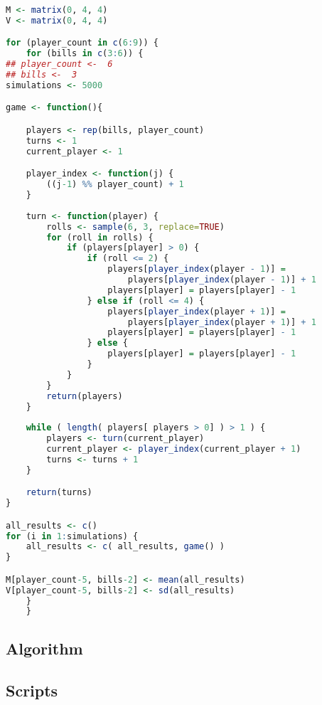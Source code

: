 \documentclass[12pt]{article}
\begin{document}
\begin{lstlisting}[language=R]
  M <- matrix(0, 4, 4)
V <- matrix(0, 4, 4)

for (player_count in c(6:9)) {
    for (bills in c(3:6)) {
## player_count <-  6
## bills <-  3
simulations <- 5000

game <- function(){

    players <- rep(bills, player_count)
    turns <- 1
    current_player <- 1

    player_index <- function(j) {
        ((j-1) %% player_count) + 1
    }
    
    turn <- function(player) {
        rolls <- sample(6, 3, replace=TRUE)
        for (roll in rolls) {
            if (players[player] > 0) {
                if (roll <= 2) {
                    players[player_index(player - 1)] =
                        players[player_index(player - 1)] + 1 
                    players[player] = players[player] - 1
                } else if (roll <= 4) {
                    players[player_index(player + 1)] =
                        players[player_index(player + 1)] + 1
                    players[player] = players[player] - 1
                } else {
                    players[player] = players[player] - 1
                }
            }
        }
        return(players)
    }
    
    while ( length( players[ players > 0] ) > 1 ) {
        players <- turn(current_player)
        current_player <- player_index(current_player + 1)
        turns <- turns + 1
    }

    return(turns)
}

all_results <- c()
for (i in 1:simulations) {
    all_results <- c( all_results, game() )
}

M[player_count-5, bills-2] <- mean(all_results)
V[player_count-5, bills-2] <- sd(all_results)
    }
    }
  \end{lstlisting}
\subsection*{Algorithm}

\subsection*{Scripts}


\end{document}
